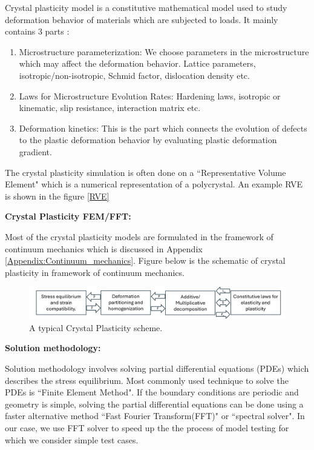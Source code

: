 Crystal plasticity model is a constitutive mathematical model used to study deformation behavior of materials which are subjected to loads. It mainly contains 3 parts \cite{roters2011advanced}:

\begin{enumerate}
    \item Microstructure parameterization: We choose parameters in the microstructure which may affect the deformation behavior. Lattice parameters, isotropic/non-isotropic, Schmid factor, dislocation density etc.
    \item Laws for Microstructure Evolution Rates: Hardening laws, isotropic or kinematic, slip resistance, interaction matrix etc.
    \item Deformation kinetics: This is the part which connects the evolution of defects to the plastic deformation behavior by evaluating plastic deformation gradient.
\end{enumerate}

The crystal plasticity simulation is often done on a ``Representative Volume Element" which is a numerical representation of a polycrystal. An example RVE is shown in the figure \ref{RVE}



\vspace{2mm}
\textbf{Crystal Plasticity FEM/FFT:}

Most of the crystal plasticity models are formulated in the framework of continuum mechanics which is discussed in Appendix \ref{Appendix:Continuum_mechanics}. Figure below is the schematic of crystal plasticity in framework of continuum mechanics.

\begin{figure}[H]
    \centering
    \includegraphics[width=\textwidth]{images/Typical_Crystal_Plasticity_model.pdf}
    \caption{A typical Crystal Plasticity scheme.}
    \label{Typical_CP_model}
\end{figure}

\textbf{Solution methodology:}

Solution methodology involves solving partial differential equations (PDEs) which describes the stress equilibrium. Most commonly used technique to solve the PDEs is ``Finite Element Method". If the boundary conditions are periodic and geometry is simple, solving the partial differential equations can be done using a faster alternative method ``Fast Fourier Transform(FFT)" or ``spectral solver". In our case, we use FFT solver to speed up the the process of model testing for which we consider simple test cases.

